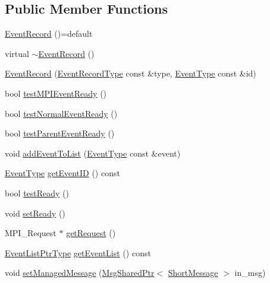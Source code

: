 \subsection*{Public Member Functions}
\begin{DoxyCompactItemize}
\item 
\hyperlink{structvt_1_1event_1_1_event_record_ad43151ff7b64e4aea444c3605b6a987e}{Event\+Record} ()=default
\item 
virtual \hyperlink{structvt_1_1event_1_1_event_record_ae46827dcbe7eab923e6083006475fa65}{$\sim$\+Event\+Record} ()
\item 
\hyperlink{structvt_1_1event_1_1_event_record_afee008ad8096ff0aa3a6bed7e94d9701}{Event\+Record} (\hyperlink{namespacevt_1_1event_a1ea9fec44d101bf40b8fd786d44ebed9}{Event\+Record\+Type} const \&type, \hyperlink{namespacevt_a009267401def7ae8bf201892222d060f}{Event\+Type} const \&id)
\item 
bool \hyperlink{structvt_1_1event_1_1_event_record_ace2823ff35b94e886a1448f8bcd039a7}{test\+M\+P\+I\+Event\+Ready} ()
\item 
bool \hyperlink{structvt_1_1event_1_1_event_record_ac19ef521b531c45e30acf3838c3b1320}{test\+Normal\+Event\+Ready} ()
\item 
bool \hyperlink{structvt_1_1event_1_1_event_record_a64981723c87d85c2d76251d333538a24}{test\+Parent\+Event\+Ready} ()
\item 
void \hyperlink{structvt_1_1event_1_1_event_record_aaeb3fbdfa74efbb88570ed88295af3ee}{add\+Event\+To\+List} (\hyperlink{namespacevt_a009267401def7ae8bf201892222d060f}{Event\+Type} const \&event)
\item 
\hyperlink{namespacevt_a009267401def7ae8bf201892222d060f}{Event\+Type} \hyperlink{structvt_1_1event_1_1_event_record_a42de3f14e7aee457dfc44f6fdc57b874}{get\+Event\+ID} () const
\item 
bool \hyperlink{structvt_1_1event_1_1_event_record_a82d8f84b3aa975cd12e1972745491106}{test\+Ready} ()
\item 
void \hyperlink{structvt_1_1event_1_1_event_record_a11d38e147a2a389c71a3fec237b7d858}{set\+Ready} ()
\item 
M\+P\+I\+\_\+\+Request $\ast$ \hyperlink{structvt_1_1event_1_1_event_record_a9444f340945fa732113583fc0b04ae7f}{get\+Request} ()
\item 
\hyperlink{namespacevt_1_1event_aa507caad8ea8ee959ccef2d57753dceb}{Event\+List\+Ptr\+Type} \hyperlink{structvt_1_1event_1_1_event_record_abb891d63f4027f5d36d53d3080c33cdf}{get\+Event\+List} () const
\item 
void \hyperlink{structvt_1_1event_1_1_event_record_a9354b50ad690549bca45eb6e68b121f0}{set\+Managed\+Message} (\hyperlink{namespacevt_ab2b3d506ec8e8d1540aede826d84a239}{Msg\+Shared\+Ptr}$<$ \hyperlink{namespacevt_a1125ac1da6c0bbf141e0ea0739d7602d}{Short\+Message} $>$ in\+\_\+msg)
\end{DoxyCompactItemize}


